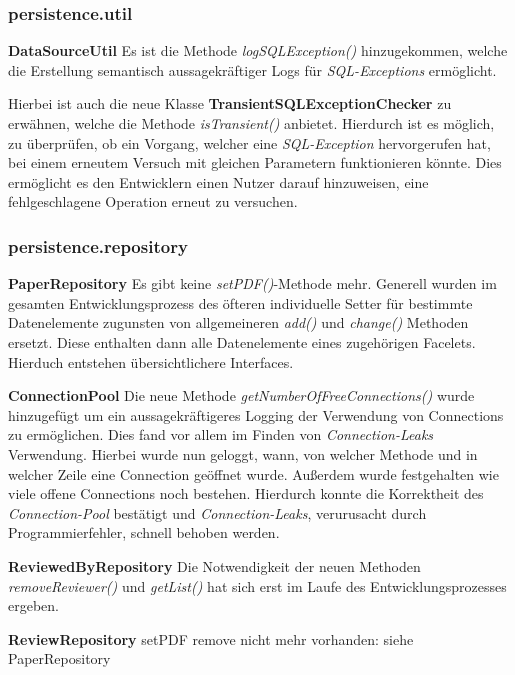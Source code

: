
\subsubsection{persistence.util}

\textbf{DataSourceUtil} Es ist die Methode \emph{logSQLException()} hinzugekommen, welche die Erstellung
semantisch aussagekräftiger Logs für \emph{SQL-Exceptions} ermöglicht.

Hierbei ist auch die neue Klasse \textbf{TransientSQLExceptionChecker} zu erwähnen, welche
die Methode \emph{isTransient()} anbietet.
Hierdurch ist es möglich, zu überprüfen, ob ein Vorgang,
welcher eine \emph{SQL-Exception} hervorgerufen hat, bei einem erneutem Versuch
mit gleichen Parametern funktionieren könnte.
Dies ermöglicht es den Entwicklern einen Nutzer darauf hinzuweisen,
eine fehlgeschlagene Operation erneut zu versuchen.

\subsubsection{persistence.repository}

\textbf{PaperRepository} Es gibt keine \emph{setPDF()}-Methode mehr.
Generell wurden im gesamten Entwicklungsprozess des öfteren individuelle Setter für
bestimmte Datenelemente zugunsten von allgemeineren \emph{add()} und \emph{change()} Methoden ersetzt.
Diese enthalten dann alle Datenelemente eines zugehörigen Facelets.
Hierduch entstehen übersichtlichere Interfaces.

\textbf{ConnectionPool} Die neue Methode \emph{getNumberOfFreeConnections()}
wurde hinzugefügt um ein aussagekräftigeres Logging der Verwendung von Connections
zu ermöglichen.
Dies fand vor allem im Finden von \emph{Connection-Leaks} Verwendung.
Hierbei wurde nun geloggt, wann, von welcher Methode und in welcher Zeile eine
Connection geöffnet wurde.
Außerdem wurde festgehalten wie viele offene Connections noch bestehen.
Hierdurch konnte die Korrektheit des \emph{Connection-Pool} bestätigt
und \emph{Connection-Leaks}, verurusacht durch Programmierfehler,
schnell behoben werden.

\textbf{ReviewedByRepository} Die Notwendigkeit der neuen Methoden
\emph{removeReviewer()} und \emph{getList()} hat sich erst im Laufe des
Entwicklungsprozesses ergeben.

\textbf{ReviewRepository} setPDF remove nicht mehr vorhanden:
siehe PaperRepository

